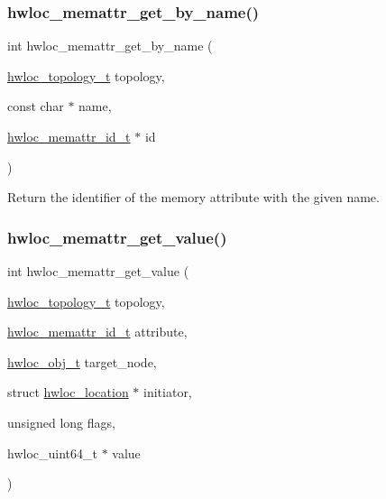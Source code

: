 \subsubsection{\texorpdfstring{hwloc\+\_\+memattr\+\_\+get\+\_\+by\+\_\+name()}{hwloc\_memattr\_get\_by\_name()}}
{\footnotesize\ttfamily int hwloc\+\_\+memattr\+\_\+get\+\_\+by\+\_\+name (\begin{DoxyParamCaption}\item[{\hyperlink{a00186_ga9d1e76ee15a7dee158b786c30b6a6e38}{hwloc\+\_\+topology\+\_\+t}}]{topology,  }\item[{const char $\ast$}]{name,  }\item[{\hyperlink{a00211_gacc82003a8610be554615995f0996c888}{hwloc\+\_\+memattr\+\_\+id\+\_\+t} $\ast$}]{id }\end{DoxyParamCaption})}



Return the identifier of the memory attribute with the given name. 

\mbox{\label{a00211_ga297e4a9adc2272446a4c7449dacef0df}} 
\subsubsection{\texorpdfstring{hwloc\+\_\+memattr\+\_\+get\+\_\+value()}{hwloc\_memattr\_get\_value()}}
{\footnotesize\ttfamily int hwloc\+\_\+memattr\+\_\+get\+\_\+value (\begin{DoxyParamCaption}\item[{\hyperlink{a00186_ga9d1e76ee15a7dee158b786c30b6a6e38}{hwloc\+\_\+topology\+\_\+t}}]{topology,  }\item[{\hyperlink{a00211_gacc82003a8610be554615995f0996c888}{hwloc\+\_\+memattr\+\_\+id\+\_\+t}}]{attribute,  }\item[{\hyperlink{a00185_ga79b8ab56877ef99ac59b833203391c7d}{hwloc\+\_\+obj\+\_\+t}}]{target\+\_\+node,  }\item[{struct \hyperlink{a00314}{hwloc\+\_\+location} $\ast$}]{initiator,  }\item[{unsigned long}]{flags,  }\item[{hwloc\+\_\+uint64\+\_\+t $\ast$}]{value }\end{DoxyParamCaption})}



